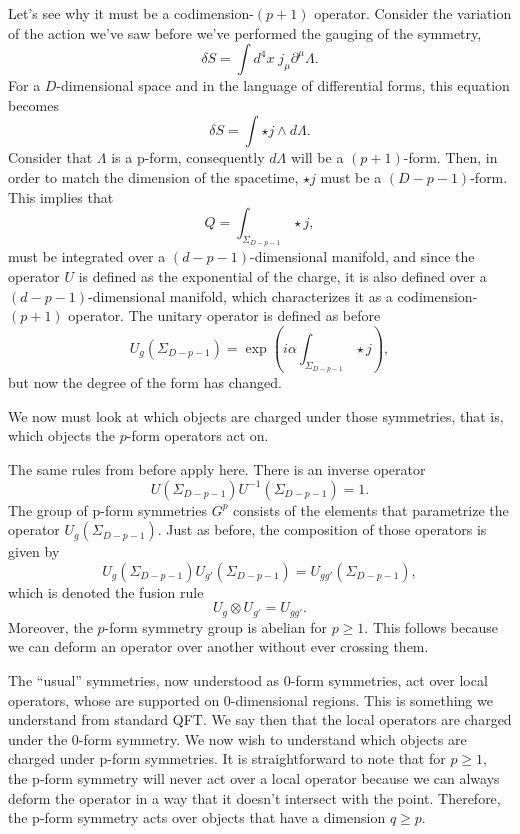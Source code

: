\documentclass{article}
\begin{document}
Let’s see why it must be a codimension-$(p+1)$ operator. Consider the variation of the action we’ve saw before we’ve performed the gauging of the symmetry,
\begin{equation}
	\delta S=\int d^4x\;j_\mu\partial^\mu\Lambda.
\end{equation}
For a $D$-dimensional space and in the language of differential forms, this equation becomes 
\begin{equation}
	\delta S=\int\star j\wedge d\Lambda.
\end{equation}
Consider that $\Lambda$  is a p-form, consequently $d\Lambda$ will be a $(p+1)$-form. Then, in order to match the dimension of the spacetime, $\star j$ must be a $(D-p-1)$-form. This implies that 
\begin{equation}
	Q=\int_{\Sigma_{D-p-1}} \star j,
\end{equation}
must be integrated over a $(d-p-1)$-dimensional manifold, and since the operator $U$ is defined as the exponential of the charge, it is also defined over a  $(d-p-1)$-dimensional manifold, which characterizes it as a codimension-$(p+1)$ operator.  The unitary operator is defined as before
\begin{equation}
	U_g(\Sigma_{D-p-1})=\exp\left(i\alpha\int_{\Sigma_{D-p-1}}\star j\right),
\end{equation}
but now the degree of the form has changed. 

We now must look at which objects are charged under those symmetries, that is, which objects the $p$-form operators act on.

The same rules from before apply here. There is an inverse operator
\begin{equation}
	U(\Sigma_{D-p-1})U^{-1}(\Sigma_{D-p-1})=1.
\end{equation}
The group of p-form symmetries $G^{p}$  consists of the elements that parametrize the operator $U_g(\Sigma_{D-p-1}).$ Just as before, the composition of those operators is given by  
\begin{equation}
	U_g(\Sigma_{D-p-1})U_{g'}(\Sigma_{D-p-1})=U_{gg'}(\Sigma_{D-p-1}),
\end{equation}
which is denoted the fusion rule 
\begin{equation}
	U_g\otimes U_{g'}=U_{gg'}.
\end{equation}
Moreover, the $p$-form symmetry group is abelian for $p\ge 1.$ This follows because we can deform an operator over another without ever crossing them. 

The “usual” symmetries, now understood as 0-form symmetries, act over local operators, whose are supported on 0-dimensional regions. This is something we understand from standard QFT. We say then that the local operators are charged under the 0-form symmetry. We now wish to understand which objects are charged under p-form symmetries. It is straightforward to note that for $p\geq1,$ the p-form symmetry will never act over a local operator because we can always deform the operator in a way that it doesn’t intersect with the point. Therefore, the p-form symmetry acts over objects that have a dimension $q\geq p$.
\end{document}
